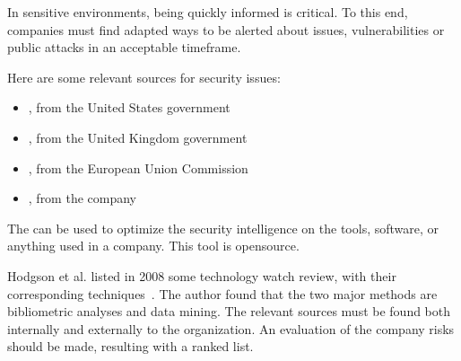 In sensitive environments, being quickly informed is critical. To this end, companies must find adapted ways to be alerted about issues, vulnerabilities or public attacks in an acceptable timeframe.

Here are some relevant sources for security issues:
\begin{itemize}
    \item {}, from the United States government
    \item {}, from the United Kingdom government
    \item {}, from the European Union Commission
    \item {}, from the  company
\end{itemize}

The  can be used to optimize the security intelligence on the tools, software, or anything used in a company. This tool is \gls{opensource}.

Hodgson et al. listed in 2008 some technology watch review, with their corresponding techniques~\cite{hodgson_intelligent_2008}. The author found that the two major methods are bibliometric analyses and data mining. The relevant sources must be found both internally and externally to the organization. An evaluation of the company risks should be made, resulting with a ranked list. %

